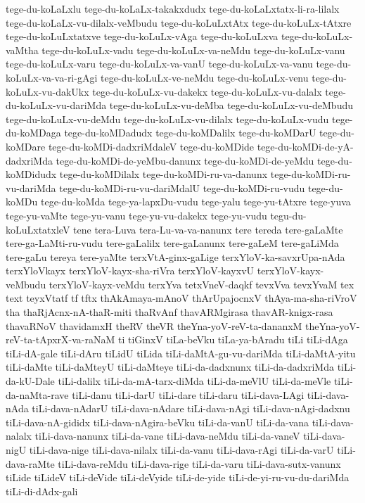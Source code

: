 {tege-du-koLaLxlu
tege-du-koLaLx-takakxdudx
tege-du-koLaLxtatx-li-ra-lilalx
tege-du-koLaLx-vu-dilalx-veMbudu
tege-du-koLuLxtAtx
tege-du-koLuLx-tAtxre
tege-du-koLuLxtatxve
tege-du-koLuLx-vAga
tege-du-koLuLxva
tege-du-koLuLx-vaMtha
tege-du-koLuLx-vadu
tege-du-koLuLx-va-neMdu
tege-du-koLuLx-vanu
tege-du-koLuLx-varu
tege-du-koLuLx-va-vanU
tege-du-koLuLx-va-vanu
tege-du-koLuLx-va-va-ri-gAgi
tege-du-koLuLx-ve-neMdu
tege-du-koLuLx-venu
tege-du-koLuLx-vu-dakUkx
tege-du-koLuLx-vu-dakekx
tege-du-koLuLx-vu-dalalx
tege-du-koLuLx-vu-dariMda
tege-du-koLuLx-vu-deMba
tege-du-koLuLx-vu-deMbudu
tege-du-koLuLx-vu-deMdu
tege-du-koLuLx-vu-dilalx
tege-du-koLuLx-vudu
tege-du-koMDaga
tege-du-koMDadudx
tege-du-koMDalilx
tege-du-koMDarU
tege-du-koMDare
tege-du-koMDi-dadxriMdaleV
tege-du-koMDide
tege-du-koMDi-de-yA-dadxriMda
tege-du-koMDi-de-yeMbu-danunx
tege-du-koMDi-de-yeMdu
tege-du-koMDidudx
tege-du-koMDilalx
tege-du-koMDi-ru-va-danunx
tege-du-koMDi-ru-vu-dariMda
tege-du-koMDi-ru-vu-dariMdalU
tege-du-koMDi-ru-vudu
tege-du-koMDu
tege-du-koMda
tege-ya-lapxDu-vudu
tege-yalu
tege-yu-tAtxre
tege-yuva
tege-yu-vaMte
tege-yu-vanu
tege-yu-vu-dakekx
tege-yu-vudu
tegu-du-koLuLxtatxleV
tene
tera-Luva
tera-Lu-va-va-nanunx
tere
tereda
tere-gaLaMte
tere-ga-LaMti-ru-vudu
tere-gaLalilx
tere-gaLanunx
tere-gaLeM
tere-gaLiMda
tere-gaLu
tereya
tere-yaMte
terxVtA-ginx-gaLige
terxYloV-ka-savxrUpa-nAda
terxYloVkayx
terxYloV-kayx-sha-riVra
terxYloV-kayxvU
terxYloV-kayx-veMbudu
terxYloV-kayx-veMdu
terxYva
tetxVneV-daqkf
tevxVva
tevxYvaM
tex
text
teyxVtatf
tf
tftx
thAkAmaya-mAnoV
thArUpajocnxV
thAya-ma-sha-riVroV
tha
thaRjAcnx-nA-thaR-miti
thaRvAnf
thavARMgirasa
thavAR-knigx-rasa
thavaRNoV
thavidamxH
theRV
theVR
theYna-yoV-reV-ta-dananxM
theYna-yoV-reV-ta-tApxrX-va-raNaM
ti
tiGinxV
tiLa-beVku
tiLa-ya-bAradu
tiLi
tiLi-dAga
tiLi-dA-gale
tiLi-dAru
tiLidU
tiLida
tiLi-daMtA-gu-vu-dariMda
tiLi-daMtA-yitu
tiLi-daMte
tiLi-daMteyU
tiLi-daMteye
tiLi-da-dadxnunx
tiLi-da-dadxriMda
tiLi-da-kU-Dale
tiLi-dalilx
tiLi-da-mA-tarx-diMda
tiLi-da-meVlU
tiLi-da-meVle
tiLi-da-naMta-rave
tiLi-danu
tiLi-darU
tiLi-dare
tiLi-daru
tiLi-dava-LAgi
tiLi-dava-nAda
tiLi-dava-nAdarU
tiLi-dava-nAdare
tiLi-dava-nAgi
tiLi-dava-nAgi-dadxnu
tiLi-dava-nA-gididx
tiLi-dava-nAgira-beVku
tiLi-da-vanU
tiLi-da-vana
tiLi-dava-nalalx
tiLi-dava-nanunx
tiLi-da-vane
tiLi-dava-neMdu
tiLi-da-vaneV
tiLi-dava-nigU
tiLi-dava-nige
tiLi-dava-nilalx
tiLi-da-vanu
tiLi-dava-rAgi
tiLi-da-varU
tiLi-dava-raMte
tiLi-dava-reMdu
tiLi-dava-rige
tiLi-da-varu
tiLi-dava-sutx-vanunx
tiLide
tiLideV
tiLi-deVide
tiLi-deVyide
tiLi-de-yide
tiLi-de-yi-ru-vu-du-dariMda
tiLi-di-dAdx-gali
}
